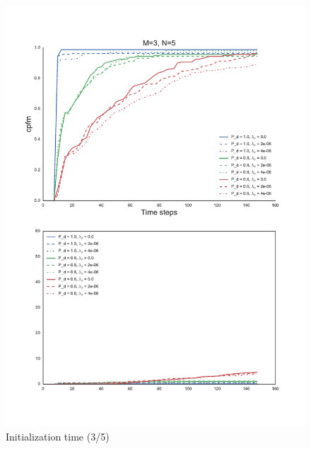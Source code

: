 {\begin{figure}
\centering
\includegraphics[height = .9\textheight]{Figures/plots/Scenario1_Init-Time(3-5).pdf}
\caption{Initialization time (3/5)}\label{fig:init_time_3-5}
\end{figure}

}
